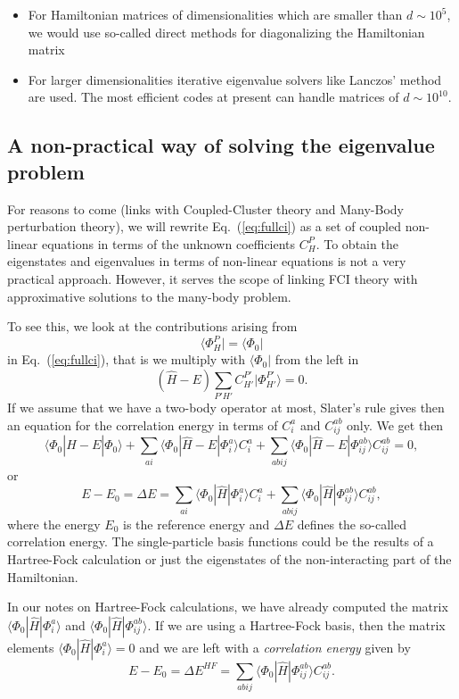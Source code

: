 \begin{itemize}
\item For Hamiltonian matrices of dimensionalities  which are smaller than $d\sim 10^5$, we would use so-called direct methods for diagonalizing the Hamiltonian matrix

\item For larger dimensionalities iterative eigenvalue solvers like Lanczos' method are used. The most efficient codes at present can handle matrices of $d\sim 10^{10}$. 
\end{itemize}

\noindent
\subsection{A non-practical way of solving the eigenvalue problem}

For reasons to come (links with Coupled-Cluster theory and Many-Body perturbation theory), 
we will rewrite Eq.~(\ref{eq:fullci}) as a set of coupled non-linear equations in terms of the unknown coefficients $C_H^P$. 
To obtain the eigenstates and eigenvalues in terms of non-linear equations is not a very practical approach. However, it serves the scope of linking FCI theory with approximative solutions to the many-body problem.

To see this, we look at the contributions arising from 
\[
\langle \Phi_H^P | = \langle \Phi_0|
\]
in  Eq.~(\ref{eq:fullci}), that is we multiply with $\langle \Phi_0 |$
from the left in 
\[
(\hat{H} -E)\sum_{P'H'}C_{H'}^{P'}|\Phi_{H'}^{P'} \rangle=0. 
\]
If we assume that we have a two-body operator at most, Slater's rule gives then an equation for the 
correlation energy in terms of $C_i^a$ and $C_{ij}^{ab}$ only.  We get then
\[
\langle \Phi_0 | \hat{H} -E| \Phi_0\rangle + \sum_{ai}\langle \Phi_0 | \hat{H} -E|\Phi_{i}^{a} \rangle C_{i}^{a}+
\sum_{abij}\langle \Phi_0 | \hat{H} -E|\Phi_{ij}^{ab} \rangle C_{ij}^{ab}=0,
\]
or 
\[
E-E_0 =\Delta E=\sum_{ai}\langle \Phi_0 | \hat{H}|\Phi_{i}^{a} \rangle C_{i}^{a}+
\sum_{abij}\langle \Phi_0 | \hat{H}|\Phi_{ij}^{ab} \rangle C_{ij}^{ab},
\]
where the energy $E_0$ is the reference energy and $\Delta E$ defines the so-called correlation energy.
The single-particle basis functions  could be the results of a Hartree-Fock calculation or just the eigenstates of the non-interacting part of the Hamiltonian. 

In our notes on Hartree-Fock calculations, 
we have already computed the matrix $\langle \Phi_0 | \hat{H}|\Phi_{i}^{a}\rangle $ and $\langle \Phi_0 | \hat{H}|\Phi_{ij}^{ab}\rangle$.  If we are using a Hartree-Fock basis, then the matrix elements
$\langle \Phi_0 | \hat{H}|\Phi_{i}^{a}\rangle=0$ and we are left with a \emph{correlation energy} given by
\[
E-E_0 =\Delta E^{HF}=\sum_{abij}\langle \Phi_0 | \hat{H}|\Phi_{ij}^{ab} \rangle C_{ij}^{ab}. 
\]


